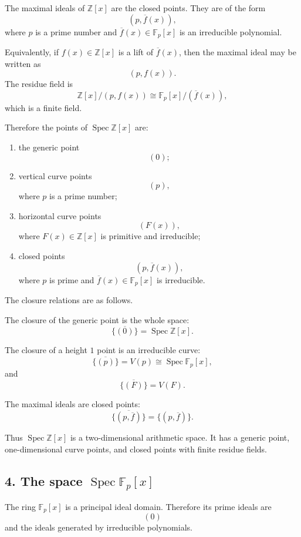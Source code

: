 	The maximal ideals of \(\mathbb Z[x]\) are the closed points. They are of the
	form
	\[
	(p,\overline f(x)),
	\]
	where \(p\) is a prime number and \(\overline f(x)\in\mathbb F_p[x]\) is an
	irreducible polynomial.
	
	Equivalently, if \(f(x)\in\mathbb Z[x]\) is a lift of \(\overline f(x)\), then
	the maximal ideal may be written as
	\[
	(p,f(x)).
	\]
	The residue field is
	\[
	\mathbb Z[x]/(p,f(x))
	\cong
	\mathbb F_p[x]/(\overline f(x)),
	\]
	which is a finite field.
	
	Therefore the points of \(\operatorname{Spec}\mathbb Z[x]\) are:
	
	\begin{enumerate}[label=\arabic*)]
		\item the generic point
		\[
		(0);
		\]
		
		\item vertical curve points
		\[
		(p),
		\]
		where \(p\) is a prime number;
		
		\item horizontal curve points
		\[
		(F(x)),
		\]
		where \(F(x)\in\mathbb Z[x]\) is primitive and irreducible;
		
		\item closed points
		\[
		(p,\overline f(x)),
		\]
		where \(p\) is prime and \(\overline f(x)\in\mathbb F_p[x]\) is irreducible.
	\end{enumerate}
	
	The closure relations are as follows.
	
	The closure of the generic point is the whole space:
	\[
	\overline{\{(0)\}}=\operatorname{Spec}\mathbb Z[x].
	\]
	
	The closure of a height \(1\) point is an irreducible curve:
	\[
	\overline{\{(p)\}}=V(p)\cong \operatorname{Spec}\mathbb F_p[x],
	\]
	and
	\[
	\overline{\{(F)\}}=V(F).
	\]
	
	The maximal ideals are closed points:
	\[
	\overline{\{(p,\overline f)\}}=\{(p,\overline f)\}.
	\]
	
	Thus \(\operatorname{Spec}\mathbb Z[x]\) is a two-dimensional arithmetic space. It has a
	generic point, one-dimensional curve points, and closed points with finite
	residue fields.
	
	\subsection*{4. The space \(\operatorname{Spec} \mathbb F_p[x]\)}
	
	The ring \(\mathbb F_p[x]\) is a principal ideal domain. Therefore its prime
	ideals are
	\[
	(0)
	\]
	and the ideals generated by irreducible polynomials.
	
